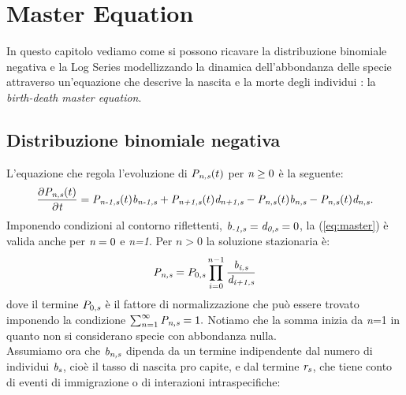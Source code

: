 \chapter{Master Equation}
In questo capitolo vediamo come si possono ricavare la distribuzione binomiale negativa e la Log Series modellizzando la dinamica dell'abbondanza delle specie attraverso un'equazione che descrive la nascita e la morte degli individui : la \emph{birth-death master equation}.

\section{Distribuzione binomiale negativa}
L'equazione che regola l'evoluzione di $\emph{P}_{\emph{n,s}}(t)$ per $\emph{n}\ge0$ è la seguente:
\begin{equation}
\frac{\partial\emph{P}_{\emph{n,s}}(t)}{\partial\emph{t}}=
\emph{P}_{\emph{n-1,s}}(t)\emph{b}_\emph{{n-1,s}}+\emph{P}_{\emph{n+1,s}}(t)\emph{d}_\emph{{n+1,s}}-\emph{P}_{\emph{n,s}}(t)\emph{b}_\emph{{n,s}}-\emph{P}_{\emph{n,s}}(t)\emph{d}_\emph{{n,s}}.
\label{eq:master}
\end{equation}
Imponendo condizioni al contorno riflettenti, $\emph{b}_\emph{{-1,s}}=\emph{d}_\emph{{0,s}}=0$, la (\ref{eq:master}) è valida anche per $\emph{n}=0$ e \emph{n=1}. Per $n>0$ la soluzione stazionaria è:
\begin{equation}
\emph{P}_{\emph{n,s}}=P_{0,\emph{s}}\prod_{i=0}^{n-1}\frac{\emph{b}_\emph{{i,s}}}{\emph{d}_\emph{{i+1,s}}}
\label{eq:steadystate}
\end{equation}
dove il termine $P_{0,\emph{s}}$ è il fattore di normalizzazione che può essere trovato imponendo la condizione $\sum_{n=1}^\infty \emph{P}_{\emph{n,s}}=1.$ Notiamo che la somma inizia da \emph{n}=1 in quanto non si considerano specie con abbondanza nulla.\\
Assumiamo ora che $\emph{b}_\emph{{n,s}}$ dipenda da un termine indipendente dal numero di individui $\emph{b}_\emph{s}$, cioè il tasso di nascita pro capite, e dal termine $\emph{r}_\emph{s}$, che tiene conto di eventi di immigrazione o di interazioni intraspecifiche:
